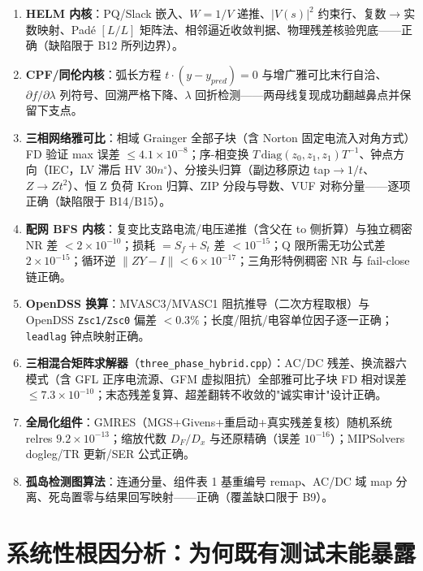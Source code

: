 \documentclass[11pt,a4paper,fontset=fandol]{ctexart}
\newcommand{\file}[1]{\texttt{#1}}
\begin{document}
\begin{enumerate}
  \item \textbf{HELM 内核}：PQ/Slack 嵌入、$W=1/V$ 递推、$|V(s)|^2$ 约束行、复数$\to$实数映射、Padé $[L/L]$ 矩阵法、相邻逼近收敛判据、物理残差核验兜底——正确（缺陷限于 B12 所列边界）。
  \item \textbf{CPF/同伦内核}：弧长方程 $t\cdot(y-y_{pred})=0$ 与增广雅可比末行自洽、$\partial f/\partial\lambda$ 列符号、回溯严格下降、$\lambda$ 回折检测——两母线复现成功翻越鼻点并保留下支点。
  \item \textbf{三相网络雅可比}：相域 Grainger 全部子块（含 Norton 固定电流入对角方式）FD 验证 max 误差 $\le 4.1\times10^{-8}$；序-相变换 $T\,\mathrm{diag}(z_0,z_1,z_1)T^{-1}$、钟点方向（IEC，LV 滞后 HV $30n^\circ$）、分接头归算（副边移原边 tap$\to 1/t$、$Z\to Zt^2$）、恒 Z 负荷 Kron 归算、ZIP 分段与导数、VUF 对称分量——逐项正确（缺陷限于 B14/B15）。
  \item \textbf{配网 BFS 内核}：复变比支路电流/电压递推（含父在 to 侧折算）与独立稠密 NR 差 $<2\times10^{-10}$；损耗 $=S_f+S_t$ 差 $<10^{-15}$；Q 限所需无功公式差 $2\times10^{-15}$；循环逆 $\lVert ZY-I\rVert<6\times10^{-17}$；三角形特例稠密 NR 与 fail-close 链正确。
  \item \textbf{OpenDSS 换算}：MVASC3/MVASC1 阻抗推导（二次方程取根）与 OpenDSS \texttt{Zsc1/Zsc0} 偏差 $<0.3\%$；长度/阻抗/电容单位因子逐一正确；\texttt{leadlag} 钟点映射正确。
  \item \textbf{三相混合矩阵求解器}（\file{three\_phase\_hybrid.cpp}）：AC/DC 残差、换流器六模式（含 GFL 正序电流源、GFM 虚拟阻抗）全部雅可比子块 FD 相对误差 $\le 7.3\times10^{-10}$；末态残差复算、超差翻转不收敛的"诚实审计"设计正确。
  \item \textbf{全局化组件}：GMRES（MGS+Givens+重启动+真实残差复核）随机系统 relres $9.2\times10^{-13}$；缩放代数 $D_F/D_x$ 与还原精确（误差 $10^{-16}$）；MIPSolvers dogleg/TR 更新/SER 公式正确。
  \item \textbf{孤岛检测图算法}：连通分量、组件表 1 基重编号 remap、AC/DC 域 map 分离、死岛置零与结果回写映射——正确（覆盖缺口限于 B9）。
\end{enumerate}

\newpage
\section{系统性根因分析：为何既有测试未能暴露}
\label{sec:rootcause}
\end{document}
